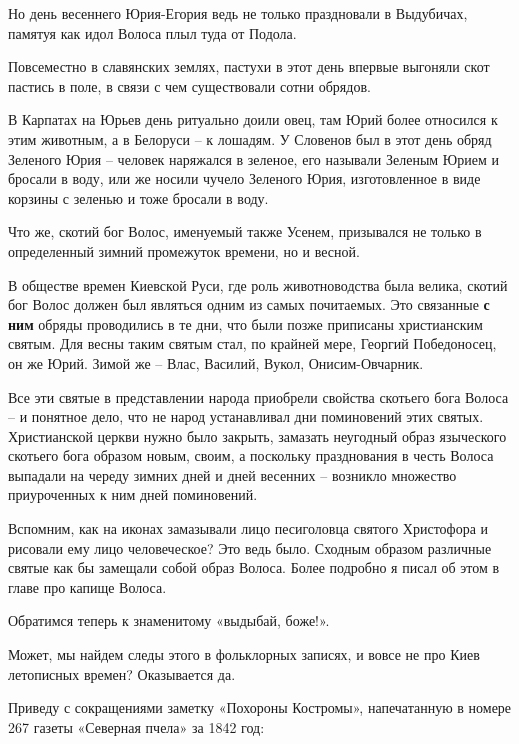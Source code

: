    Но день весеннего Юрия-Егория ведь не только праздновали в Выдубичах, памятуя как идол Волоса плыл туда от Подола. 

   Повсеместно в славянских землях, пастухи в этот день впервые выгоняли скот пастись в поле, в связи с чем существовали сотни обрядов.

   В Карпатах на Юрьев день ритуально доили овец, там Юрий более относился к этим животным, а в Белоруси – к лошадям. У Словенов был в этот день обряд Зеленого Юрия – человек наряжался в зеленое, его называли Зеленым Юрием и бросали в воду, или же носили чучело Зеленого Юрия, изготовленное в виде корзины с зеленью и тоже бросали в воду.

   Что же, скотий бог Волос, именуемый также Усенем, призывался не только в определенный зимний промежуток времени, но и весной. 

   В обществе времен Киевской Руси, где роль животноводства была велика, скотий бог Волос должен был являться одним из самых почитаемых. Это связанные \textbf{с ним} обряды проводились в те дни, что были позже приписаны христианским святым. Для весны таким святым стал, по крайней мере, Георгий Победоносец, он же Юрий. Зимой же – Влас, Василий, Вукол, Онисим-Овчарник.

   Все эти святые в представлении народа приобрели свойства скотьего бога Волоса – и понятное дело, что не народ устанавливал дни поминовений этих святых. Христианской церкви нужно было закрыть, замазать неугодный образ языческого скотьего бога образом новым, своим, а поскольку празднования в честь Волоса выпадали на череду зимних дней и дней весенних – возникло множество приуроченных к ним дней поминовений.

    Вспомним, как на иконах замазывали лицо песиголовца святого Христофора и рисовали ему лицо человеческое? Это ведь было. Сходным образом различные святые как бы замещали собой образ Волоса. Более подробно я писал об этом в главе про капище Волоса.

   Обратимся теперь к знаменитому «выдыбай, боже!».

   Может, мы найдем следы этого в фольклорных записях, и вовсе не про Киев летописных времен? Оказывается да.

   Приведу с сокращениями заметку «Похороны Костромы», напечатанную в номере 267 газеты «Северная пчела» за 1842 год:

